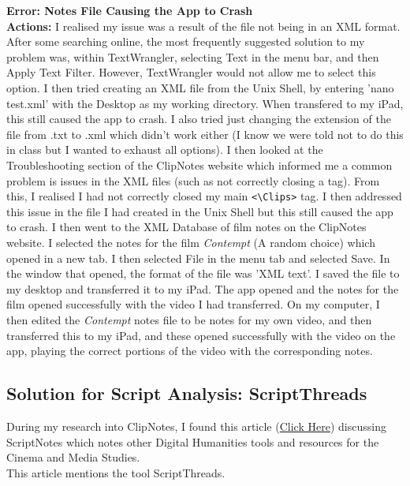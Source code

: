 \documentclass{article}
\begin{document}
\textbf{Error: Notes File Causing the App to Crash}\label{crash}\\
\textbf{Actions:} I realised my issue was a result of the file not being in an XML format. After some searching online, the most frequently suggested solution to my problem was, within TextWrangler, selecting Text in the menu bar, and then Apply Text Filter. However, TextWrangler would not allow me to select this option. I then tried creating an XML file from the Unix Shell, by entering 'nano test.xml' with the Desktop as my working directory. When transfered to my iPad, this still caused the app to crash. I also tried just changing the extension of the file from .txt to .xml which didn't work either (I know we were told not to do this in class but I wanted to exhaust all options). I then looked at the Troubleshooting section of the ClipNotes website which informed me a common problem is issues in the XML files (such as not correctly closing a tag). From this, I realised I had not correctly closed my main \verb|<\Clips>| tag. I then addressed this issue in the file I had created in the Unix Shell but this still caused the app to crash. I then went to the XML Database of film notes on the ClipNotes website. I selected the notes for the film \textit{Contempt} (A random choice) which opened in a new tab. I then selected File in the menu tab and selected Save. In the window that opened, the format of the file was 'XML text'. I saved the file to my desktop and transferred it to my iPad. The app opened and the notes for the film opened successfully with the video I had transferred. On my computer, I then edited the \textit{Contempt} notes file to be notes for my own video, and then transferred this to my iPad, and these opened successfully with the video on the app, playing the correct portions of the video with the corresponding notes.

\subsection{Solution for Script Analysis: ScriptThreads}
During my research into ClipNotes, I found this article (\href{http://www.teachingmedia.org/clipnotes-in-the-classroom-video-annotation-software-for-instruction-and-collaboration/}{Click Here}) discussing ScriptNotes which notes other Digital Humanities tools and resources for the Cinema and Media Studies. \\
This article mentions the tool ScriptThreads.\\
\end{document}
